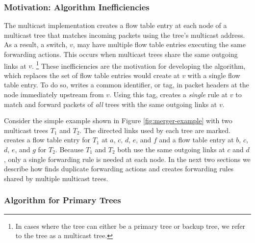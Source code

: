 \subsubsection{Motivation: \basen Algorithm Inefficiencies}
\label{subsubsec:merge-motivate}

The \base multicast implementation creates a flow table entry at each node of a multicast tree that matches incoming packets using the tree's multicast address. 
As a result, a switch, $v$, may have multiple flow table entries executing the same forwarding actions.  This occurs when multicast trees share the same outgoing links at $v$. 
\footnote{In cases where the tree can either be a primary tree or backup tree, we refer to the tree as a multicast tree.}
These inefficiencies are the motivation for developing the \merge algorithm, which replaces the set of flow table entries \base would create at $v$ with a single flow table entry. 
To do so, \merge writes a common identifier, or tag, in packet headers at the node immediately upstream from $v$. Using this tag, \merge creates a \emph{single} rule at $v$ to match and 
forward packets of \emph{all} trees with the same outgoing links at $v$.

Consider the simple example shown in Figure \ref{fig:merger-example} with two multicast trees $T_1$ and $T_2$. The directed links used by each tree are marked.
\base creates a flow table entry for $T_1$ at $a$, $c$, $d$, $e$, and $f$ and a flow table entry at $b$, $c$, $d$, $e$, and $g$ for $T_2$.  Because 
$T_1$ and $T_2$ both use the same outgoing links at $c$ and $d$, only a single forwarding rule is needed at each node.  In the next two sections we describe how \merge 
finds duplicate forwarding actions and creates forwarding rules shared by multiple multicast trees.





\subsubsection{\mergen Algorithm for Primary Trees}
\label{subsubsec:merge-primary}


